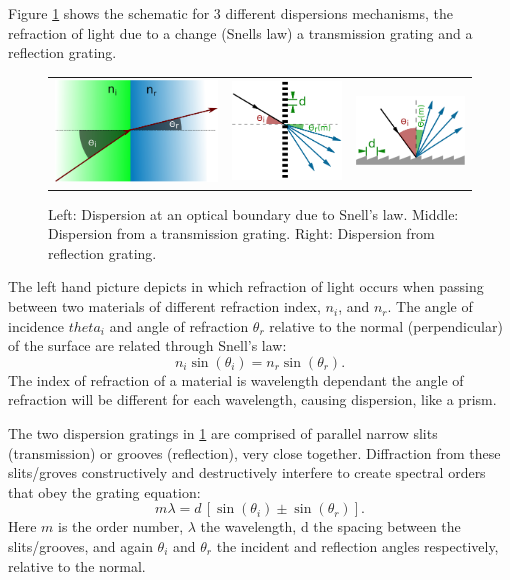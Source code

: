 Figure \cref{fig:dispersion_elements} shows the schematic for 3 different dispersions mechanisms, the refraction of light due to a change (Snells law) a transmission grating and a reflection grating.
\begin{figure}
    \centering
    \begin{tabular}{ccc}
   \includegraphics[width=0.3\linewidth]{figures/spectroscopy/snells_law} & \includegraphics[width=0.2\linewidth]{figures/spectroscopy/dispersion_grism-transmission} & \includegraphics[width=0.3\linewidth]{figures/spectroscopy/dispersion_grism-reflection} \\
\end{tabular}
    \caption{Left: Dispersion at an optical boundary due to Snell's law.
        Middle: Dispersion from a transmission grating.
        Right: Dispersion from reflection grating.}
    \label{fig:dispersion_elements}
\end{figure}
The left hand picture depicts in which refraction of light occurs when passing between two materials of different refraction index, $n_{i}$, and $n_{r}$.
The angle of incidence $theta_{i}$ and angle of refraction $\theta_{r}$ relative to the normal (perpendicular) of the surface are related through Snell's law:
\[n_{i} \sin(\theta_{i}) = n_{r} \sin(\theta_{r}).\]
The index of refraction of a material is wavelength dependant the angle of refraction will be different for each wavelength, causing dispersion, like a prism.

The two dispersion gratings in \cref{fig:dispersion_elements} are comprised of parallel narrow slits (transmission) or grooves (reflection), very close together.
Diffraction from these slits/groves constructively and destructively interfere to create spectral orders that obey the grating equation:
\begin{equation}
m \lambda = d \, [\sin(\theta_{i}) \pm \sin(\theta_{r})].
\end{equation}
Here $m$ is the order number, $\lambda$ the wavelength, d the spacing between the slits/grooves, and again $\theta_{i}$ and $\theta_{r}$ the incident and reflection angles respectively, relative to the normal.


